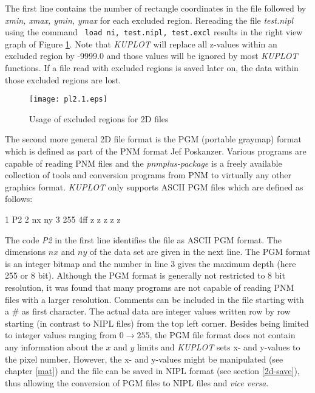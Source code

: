 The first line contains the number of rectangle coordinates in the
file followed by {\it xmin, xmax, ymin, ymax} for each excluded
region. Rereading the file {\it test.nipl} using the command {\tt
load ni, test.nipl, test.excl} results in the right view graph of
Figure \ref{pl2-fig1}.  Note that {\it KUPLOT} will replace all
z-values within an excluded region by -9999.0 and those values will
be ignored by most {\it KUPLOT} functions.  If a file read with
excluded regions is saved later on, the data within those excluded
regions are lost.

\begin{figure}[!tbh]
   \centering
   \texttt{[image: pl2.1.eps]}
   \caption{Usage of excluded regions for 2D files}
   \label{pl2-fig1}
\end{figure}

The second more general 2D file format is the PGM (portable graymap)
format which is defined as part of the  PNM format Jef Poskanzer.
Various programs are capable of reading PNM files and the {\it
pnmplus-package} is a freely available collection of tools and
conversion programs from PNM to virtually any other graphics format.
{\it KUPLOT} only supports ASCII PGM files which are defined as
follows:

\begin{MacVerbatim}
    1      P2
    2      nx ny
    3      255
    4ff    z z z z z
\end{MacVerbatim}

The code {\it P2} in the first line identifies the file as ASCII PGM
format. The dimensions $nx$ and $ny$ of the data set are given in
the next line. The PGM format is an integer bitmap and the number in
line 3 gives the maximum depth (here 255 or 8 bit). Although the PGM
format is generally not restricted to 8 bit resolution, it was found
that many programs are not capable of reading PNM files with a
larger resolution. Comments can be included in the file starting
with a \# as first character. The actual data are integer values
written row by row starting (in contrast to NIPL files) from the top
left corner. Besides being limited to integer values ranging from $0
\rightarrow 255$, the PGM file format does not contain any
information about the $x$ and $y$ limits and {\it KUPLOT} sets x-
and y-values to the pixel number. However, the x- and y-values might
be manipulated (see chapter \ref{mat}) and the file can be saved in
NIPL format (see section \ref{2d-save}), thus allowing the
conversion of PGM files to NIPL files and {\it vice versa}.\par

